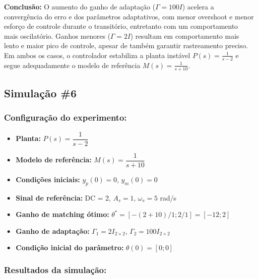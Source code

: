 \documentclass[10pt]{article}
\begin{document}
\textbf{Conclusão:} O aumento do ganho de adaptação ($\Gamma = 100I$) acelera a convergência do erro e dos parâmetros adaptativos, com menor overshoot e menor esforço de controle durante o transitório, entretanto com um comportamento mais oscilatório. Ganhos menores ($\Gamma = 2I$) resultam em comportamento mais lento e maior pico de controle, apesar de também garantir rastreamento preciso. Em ambos os casos, o controlador estabiliza a planta instável $P(s)=\frac{1}{s-2}$ e segue adequadamente o modelo de referência $M(s)=\frac{1}{s+10}$.

\newpage

\subsection{Simulação \#6}
\subsubsection{Configuração do experimento:}
\begin{itemize}
\item \textbf{Planta:} $P(s) = \dfrac{1}{s - 2}$
\item \textbf{Modelo de referência:} $M(s) = \dfrac{1}{s + 10}$
\item \textbf{Condições iniciais:} $y_p(0)=0$, $y_m(0)=0$
\item \textbf{Sinal de referência:} DC = 2, $A_s=1$, $\omega_s=5$ rad/s
\item \textbf{Ganho de matching ótimo:} $\theta^* = [-(2+10)/1;2/1] = [-12;2]$
\item \textbf{Ganho de adaptação:} $\Gamma_1 = 2I_{2\times2}$, $\Gamma_2 = 100I_{2\times2}$
\item \textbf{Condição inicial do parâmetro:} $\theta(0) = [0;0]$
\end{itemize}

\subsubsection{Resultados da simulação:}
\end{document}
